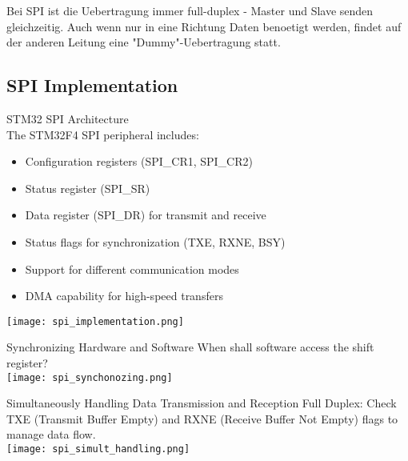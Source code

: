 \begin{remark}
    Bei SPI ist die Uebertragung immer full-duplex - Master und Slave senden gleichzeitig. Auch wenn nur in eine Richtung Daten benoetigt werden, findet auf der anderen Leitung eine "Dummy"-Uebertragung statt.
\end{remark}









\subsection{SPI Implementation}





\begin{concept}{STM32 SPI Architecture}\\
The STM32F4 SPI peripheral includes:
\begin{itemize}
    \item Configuration registers (SPI\_CR1, SPI\_CR2)
    \item Status register (SPI\_SR)
    \item Data register (SPI\_DR) for transmit and receive
    \item Status flags for synchronization (TXE, RXNE, BSY)
    \item Support for different communication modes
    \item DMA capability for high-speed transfers
\end{itemize}
\texttt{[image: spi\_implementation.png]}
\end{concept}


\begin{theorem}{Synchronizing Hardware and Software} 
    When shall software access the shift register?\\
    \texttt{[image: spi\_synchonozing.png]}
\end{theorem}

\begin{KR}{Simultaneously Handling Data Transmission and Reception}
    Full Duplex: Check TXE (Transmit Buffer Empty) and RXNE (Receive Buffer Not Empty) flags to manage data flow.\\
    \texttt{[image: spi\_simult\_handling.png]}
\end{KR}


